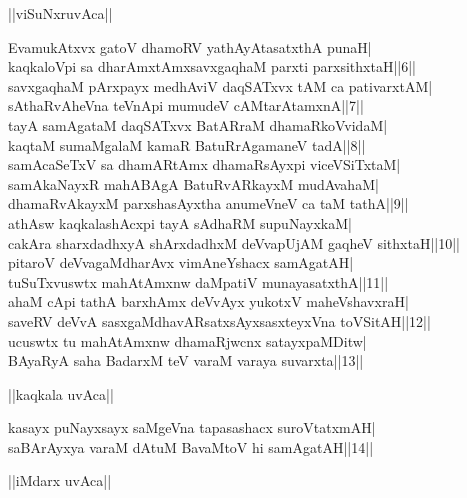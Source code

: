 \documentclass{article}
\begin{document}
\begin{center}
||viSuNxruvAca||
\end{center}

EvamukAtxvx gatoV dhamoRV yathAyAtasatxthA punaH|\\
kaqkaloVpi sa dharAmxtAmxsavxgaqhaM parxti parxsithxtaH||6||\\
savxgaqhaM pArxpayx medhAviV daqSATxvx tAM ca pativarxtAM|\\
sAthaRvAheVna teVnApi mumudeV cAMtarAtamxnA||7||\\
tayA samAgataM daqSATxvx BatARraM dhamaRkoVvidaM|\\
kaqtaM sumaMgalaM kamaR BatuRrAgamaneV tadA||8||\\
samAcaSeTxV sa dhamARtAmx dhamaRsAyxpi viceVSiTxtaM|\\
samAkaNayxR mahABAgA BatuRvARkayxM mudAvahaM|\\
dhamaRvAkayxM parxshasAyxtha anumeVneV ca taM tathA||9||\\
athAsw kaqkalashAcxpi tayA sAdhaRM supuNayxkaM|\\
cakAra sharxdadhxyA shArxdadhxM deVvapUjAM gaqheV sithxtaH||10||\\
pitaroV deVvagaMdharAvx vimAneYshacx samAgatAH|\\
tuSuTxvuswtx mahAtAmxnw daMpatiV munayasatxthA||11||\\
ahaM cApi tathA barxhAmx deVvAyx yukotxV maheVshavxraH|\\
saveRV deVvA sasxgaMdhavARsatxsAyxsasxteyxVna toVSitAH||12||\\
ucuswtx tu mahAtAmxnw dhamaRjwcnx satayxpaMDitw|\\
BAyaRyA saha BadarxM teV varaM varaya suvarxta||13||\\

\begin{center}
||kaqkala uvAca||
\end{center}

kasayx puNayxsayx saMgeVna tapasashacx suroVtatxmAH|\\
saBArAyxya varaM dAtuM BavaMtoV hi samAgatAH||14||\\

\begin{center}
||iMdarx uvAca||
\end{center}
\end{document}
